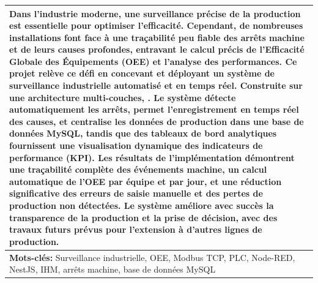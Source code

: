 \begin{center}
\begin{tabular}{|p{14.5cm}|}
Dans l'industrie moderne, une surveillance précise de la production est essentielle pour optimiser l'efficacité. 
Cependant, de nombreuses installations font face à une traçabilité peu fiable des arrêts machine 
et de leurs causes profondes, entravant le calcul précis de l'Efficacité Globale des Équipements 
(OEE) et l'analyse des performances. Ce projet relève ce défi en concevant et déployant un système 
de surveillance industrielle automatisé et en temps réel. Construite sur une architecture multi-couches, 
. Le système détecte automatiquement les arrêts, permet l'enregistrement en temps réel des causes, et centralise les données de production dans une base de données MySQL, tandis que des tableaux de bord analytiques fournissent une visualisation dynamique des indicateurs de performance (KPI). Les résultats de l'implémentation démontrent une traçabilité complète des événements machine, un calcul automatique de l'OEE par équipe et par jour, et une réduction significative des erreurs de saisie manuelle et des pertes de production non détectées. Le système améliore avec succès la transparence de la production et la prise de décision, avec des travaux futurs prévus pour l'extension à d'autres lignes de production.
\vspace{0.2cm}
\\
\hline
\textbf{Mots-clés:} Surveillance industrielle, OEE, Modbus TCP, PLC, Node-RED, NestJS, IHM, arrêts machine, base de données MySQL \\
\hline
\end{tabular}
\end{center}

\vfill